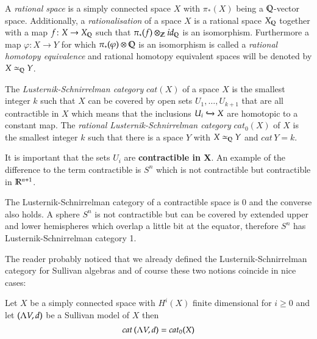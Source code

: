 \begin{Definition}
 A \emph{rational space} is a simply connected space $X$ with $\pi_*(X)$ being a $\mathbb{Q}$-vector space.
 Additionally, a  \emph{rationalisation} of a space $X$ is a rational space $X_{\mathbb{Q}}$ together with a map
 $f \colon X \to X_{\mathbb{Q}}$ such that $\pi_*(f) \otimes_{\mathbb{Z}} id_{\mathbb{Q}}$ is an isomorphism. 
 Furthermore a map $\varphi \colon X \to Y$ for which $\pi_*(\varphi) \otimes \mathbb{Q}$ is an isomorphism is 
 called a \emph{rational homotopy equivalence} and rational homotopy equivalent spaces will be denoted by
 $X \simeq_{\mathbb{Q}} Y$.
\end{Definition}


\begin{Definition}
 The \emph{Lusternik-Schnirrelman category} $cat(X)$ of a space $X$ is the smallest integer $k$ such that 
 $X$ can be covered by open sets $U_1, \ldots, U_{k+1}$ that are all contractible in $X$ which
 means that the inclusions $U_i \xhookrightarrow{} X$ are homotopic to a constant map.
 The \emph{rational Lusternik-Schnirrelman category} $cat_0(X)$ of $X$ is the smallest integer $k$ such that there is a space $Y$
 with $ X \simeq_{\mathbb{Q}} Y$ and $cat \, Y = k$.
\end{Definition}

\begin{Remark}
 It is important that the sets $U_i$ are \textbf{contractible in X}. 
 An example of the difference to the term contractible is $S^n$ which is not contractible but contractible in $\mathbb{R}^{n+1}$. 
\end{Remark}

\begin{Example}
 The Lusternik-Schnirrelman category of a contractible space is $0$ and the converse also holds.
 A sphere $S^n$ is not contractible but can be covered by extended upper and lower hemispheres which
 overlap a little bit at the equator, therefore $S^n$ has Lusternik-Schnirrelman category 1.
\end{Example}

The reader probably noticed that we already defined the Lusternik-Schnirrelman category for Sullivan algebras and
of course these two notions coincide in nice cases:

\begin{Proposition}
 Let $X$ be a simply connected space with $H^i(X)$ finite dimensional for $i \geq 0$ and let $(\Lambda V,d)$ be 
 a Sullivan model of $X$ then
 $$ cat \, (\Lambda V,d) = cat_0 (X)$$
\end{Proposition}

